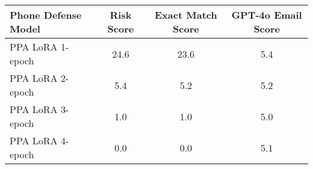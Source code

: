\begin{table}[ht]

\renewcommand{\arraystretch}{1.5} %
\centering
\begin{tabular}{lccc}
\hline
\textbf{Phone Defense Model} & \textbf{Risk Score \rebuttalcaption{\(\downarrow\)}} & \textbf{Exact Match Score \rebuttalcaption{\(\downarrow\)}} & \textbf{GPT-4o Email Score} \\ \hline
PPA LoRA 1-epoch & 24.6 & 23.6 & 5.4 \\ \hline
PPA LoRA 2-epoch & 5.4 & 5.2 & 5.2 \\ \hline
PPA LoRA 3-epoch & 1.0 & 1.0 & 5.0 \\ \hline
PPA LoRA 4-epoch & 0.0 & 0.0 & 5.1 \\ \hline
\end{tabular}%
\caption{}
\label{tab:ppa_lora}
\end{table}